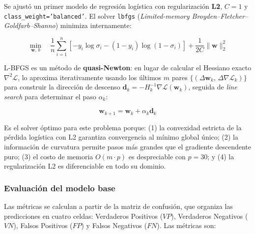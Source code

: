 \documentclass[spanish]{article}
\begin{document}
Se ajustó un primer modelo de regresión logística con regularización \textbf{L2}, $C = 1$ y \texttt{class\_weight='balanced'}. El solver \texttt{lbfgs} (\textit{Limited-memory Broyden--Fletcher--Goldfarb--Shanno}) minimiza internamente:

\begin{equation}
\min_{\mathbf{w},\, b} \quad \frac{1}{n} \sum_{i=1}^{n} \left[ -y_i \log \sigma_i - (1-y_i) \log(1-\sigma_i) \right] + \frac{1}{2C} \|\mathbf{w}\|_2^2
\end{equation}

L-BFGS es un método de \textbf{quasi-Newton}: en lugar de calcular el Hessiano exacto $\nabla^2 \mathcal{L}$, lo aproxima iterativamente usando los últimos $m$ pares $\{(\Delta \mathbf{w}_k,\, \Delta \nabla \mathcal{L}_k)\}$ para construir la dirección de descenso $\mathbf{d}_k = -H_k^{-1} \nabla \mathcal{L}(\mathbf{w}_k)$, seguida de \textit{line search} para determinar el paso $\alpha_k$:

\begin{equation}
\mathbf{w}_{k+1} = \mathbf{w}_k + \alpha_k \mathbf{d}_k
\end{equation}

Es el solver óptimo para este problema porque: (1) la convexidad estricta de la pérdida logística con L2 garantiza convergencia al mínimo global único; (2) la información de curvatura permite pasos más grandes que el gradiente descendente puro; (3) el costo de memoria $O(m \cdot p)$ es despreciable con $p=30$; y (4) la regularización L2 es diferenciable en todo su dominio.

\subsubsection{Evaluación del modelo base}

Las métricas se calculan a partir de la matriz de confusión, que organiza las predicciones en cuatro celdas: Verdaderos Positivos ($VP$), Verdaderos Negativos ($VN$), Falsos Positivos ($FP$) y Falsos Negativos ($FN$). Las métricas son:
\end{document}
